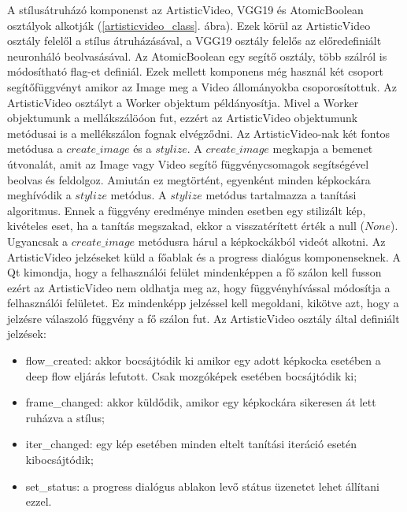 \documentclass[12pt, a4paper, oneside]{book}
\theoremstyle{tetel}
\begin{document}
A stílusátruházó komponenst az ArtisticVideo, VGG19 és AtomicBoolean osztályok alkotják (\ref{artisticvideo_class}. ábra). Ezek körül az ArtisticVideo osztály felelől a stílus átruházásával, a VGG19 osztály felelős az előredefiniált neuronháló beolvasásával. Az AtomicBoolean egy segítő osztály, több szálról is módosítható flag-et definiál. Ezek mellett komponens még használ két csoport segítőfüggvényt amikor az Image meg a Video állományokba csoporosítottuk.
\newline
\indent
Az ArtisticVideo osztályt a Worker objektum példányosítja. Mivel a Worker objektumunk a mellákszálöóon fut, ezzért az ArtisticVideo objektumunk metódusai is a mellékszálon fognak elvégződni. Az ArtisticVideo-nak két fontos metódusa a \(create\_image\) és a \(stylize\). A \(create\_image\) megkapja a bemenet útvonalát, amit az Image vagy Video segítő függvénycsomagok segítségével beolvas és feldolgoz. Amiután ez megtörtént, egyenként minden képkockára meghívódik a \(stylize\) metódus. A \(stylize\) metódus tartalmazza a tanítási algoritmus. Ennek a függvény eredménye minden esetben egy stilizált kép, kivételes eset, ha a tanítás megszakad, ekkor a visszatérített érték a null (\(None\)). Ugyancsak a \(create\_image\) metódusra hárul a képkockákból videót alkotni. 
\newline
\indent
Az ArtisticVideo jelzéseket küld a főablak és a progress dialógus komponenseknek. A Qt kimondja, hogy a felhasználói felület mindenképpen a fő szálon kell fusson ezért az ArtisticVideo nem oldhatja meg az, hogy függvényhívással módosítja a felhasználói felületet. Ez mindenképp jelzéssel kell megoldani, kikötve azt, hogy a jelzésre válaszoló függvény a fő szálon fut. Az ArtisticVideo osztály által definiált jelzések:

\begin{itemize}
	\item flow\_created: akkor bocsájtódik ki amikor egy adott képkocka esetében a deep flow eljárás lefutott. Csak mozgóképek esetében bocsájtódik ki;
	\item frame\_changed: akkor küldődik, amikor egy képkockára sikeresen át lett ruházva a stílus;
	\item iter\_changed: egy kép esetében minden eltelt tanítási iteráció esetén kibocsájtódik;
	\item set\_status: a progress dialógus ablakon levő státus üzenetet lehet állítani ezzel.
\end{itemize}
\end{document}
